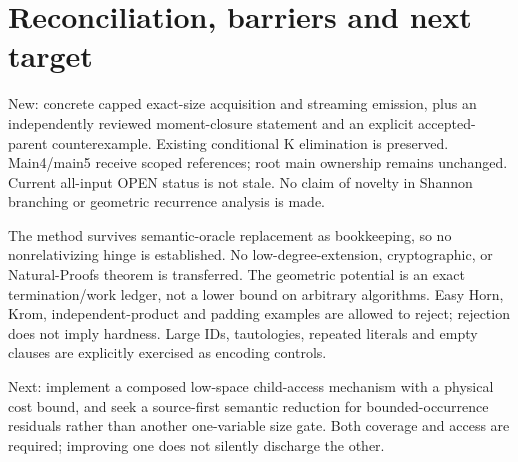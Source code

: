 \documentclass[11pt]{article}
\begin{document}
\section{Reconciliation, barriers and next target}
New: concrete capped exact-size acquisition and streaming emission, plus an
independently reviewed moment-closure statement and an explicit accepted-parent
counterexample. Existing conditional K elimination is preserved. Main4/main5
receive scoped references; root main ownership remains unchanged. Current
all-input OPEN status is not stale. No claim of novelty in Shannon branching
or geometric recurrence analysis is made.

The method survives semantic-oracle replacement as bookkeeping, so no
nonrelativizing hinge is established. No low-degree-extension, cryptographic,
or Natural-Proofs theorem is transferred. The geometric potential is an exact
termination/work ledger, not a lower bound on arbitrary algorithms. Easy Horn,
Krom, independent-product and padding examples are allowed to reject; rejection
does not imply hardness. Large IDs, tautologies, repeated literals and empty
clauses are explicitly exercised as encoding controls.

Next: implement a composed low-space child-access mechanism with a physical
cost bound, and seek a source-first semantic reduction for bounded-occurrence
residuals rather than another one-variable size gate. Both coverage and access
are required; improving one does not silently discharge the other.
\end{document}
